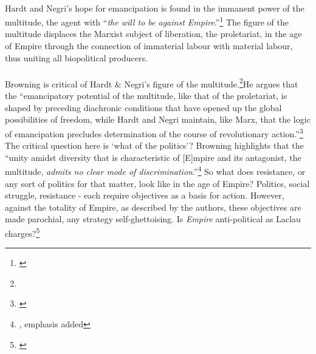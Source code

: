 \documentclass[12pt,a4paper,titlepage]{article}
\begin{document}
\paragraph{}Hardt and Negri's hope for emancipation is found in the immanent power of the multitude, the agent with ``\textit{the will to be against Empire}.''\footnote{\cite[p. 210, emphasis in original]{Hardt:2001jl}} The figure of the multitude displaces the Marxist subject of liberation, the proletariat, in the age of Empire through the connection of immaterial labour with material labour, thus uniting all biopolitical producers.

\paragraph{}Browning is critical of Hardt \& Negri's figure of the multitude.\footnote{}He argues that the ``emancipatory potential of the multitude, like that of the proletariat, is shaped by preceding diachronic conditions that have opened up the global possibilities of freedom, while Hardt and Negri maintain, like Marx, that the logic of emancipation precludes determination of the course of revolutionary action.''\footnote{\cite[p. 195]{browning:2005gi}} The critical question here is `what of the politics'? Browning highlights that the ``unity amidst diversity that is characteristic of [E]mpire and its antagonist, the multitude, \textit{admits no clear mode of discrimination}.''\footnote{\cite[p. 198]{browning:2005gi}, emphasis added} So what does resistance, or any sort of politics for that matter, look like in the age of Empire? Politics, social struggle, resistance - each require objectives as a basis for action. However, against the totality of Empire, as described by the authors, these objectives are made parochial, any strategy self-ghettoising. Is \textit{Empire} anti-political as Laclau charges?\footnote{\cite{laclau:2005ss}}
\end{document}

